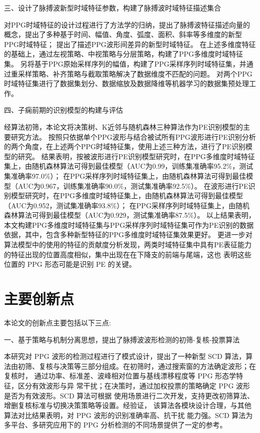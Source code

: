三、设计了脉搏波新型时域特征参数，构建了脉搏波时域特征描述集合

对PPG时域特征的设计过程进行了方法学的归纳，提出了脉搏波特征描述向量的概念，提出了多种基于时间、幅值、角度、弧度、面积、斜率等多维度的新型PPG时域特征；
提出了描述PPG波形间差异的新型时域特征。
在上述多维度特征的基础上，通过左视策略、中视策略与分层策略，构建了PPG多维度时域特征集。
另将基于PPG原始采样序列的幅值，构建了PPG采样序列时域特征集，并通过重采样策略、补齐策略与截取策略解决了数据维度不匹配的问题。
对两个PPG时域特征集进行了数据集划分、数据缩放及数据降维等机器学习的数据集预处理工作。

四、子痫前期的识别模型的构建与评估

经算法初筛，本论文将决策树、K近邻与随机森林三种算法作为PE识别模型的主要研究方法。
按照只依据单个PPG波形与结合被试所有PPG波形进行PE识别分析的两个角度，在上述两个PPG时域特征集，使用上述三种方法，进行了PE识别模型的研究。
结果表明，按被波形进行PE识别模型研究时，在PPG多维度时域特征集上，由随机森林算法可得到最佳模型（AUC为0.99，训练集准确率95.2\%，测试集准确率97.0\%）；
在PPG采样序列时域特征集上，由随机森林算法可得到最佳模型（AUC为0.967，训练集准确率90.0\%，测试集准确率92.5\%）。
在波形进行PE识别模型研究时，在PPG多维度时域特征集上，由随机森林算法可得到最佳模型（AUC为0.952，测试集准确率93.8\%）；
在PPG采样序列时域特征集上，由随机森林算法可得到最佳模型（AUC为0.929，测试集准确率87.5\%）。
以上结果表明，本文构建PPG多维度时域特征集与PPG采样序列时域特征集可作为PE识别的数据依据，其中，包含多种新型特征的PPG多维度时域特征集效果更好。
更进一步对算法模型中的使用的特征的贡献度分析发现，两类时域特征集中具有PE表征能力的特征出现的位置高度相似，集中出现在在下降支的前端与尾端，这也
表明这些位置的 PPG 形态可能是识别 PE 的关键。


\section{主要创新点}
本论文的创新点主要包括以下三点:

一、基于策略与机制分离思想，提出了脉搏波波形检测的初筛-复核-投票算法

本研究对 PPG 波形的检测过程进行了模式设计，提出了一种新型 SCD 算法，算
法由初筛、复核与决策等三部分组成。在初筛时，通过搜索窗的方法确定波形；在复核时，
通过功率、标准差、波峰相对位置与基线漂移程度等 PPG 形态学特征，区分有效波形与异
常干扰；在决策时，通过加权投票的策略确定 PPG 波形是否为有效波形。SCD 算法可根据
使用场景进行二次开发，支持更改初筛算法、增删复核标准与切换决策策略等设置。经验证，
该算法各模块设计合理，与其他算法对比结果表明，对 PPG 波形的识别准确率高、抗干扰
能力强。SCD 算法为多平台、多研究应用下的 PPG 分析检测的不同场景提供了一定的参考。

